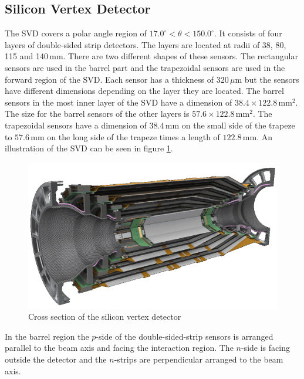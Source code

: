 \documentclass[a4paper,11pt,twosided,final,german,openbib,pdftex,listof=totoc,bibliography=totoc]{scrbook}
\begin{document}
\subsection{Silicon Vertex Detector}
\label{sec:Silicon}
The SVD covers a polar angle region of $17.0^{\circ} < \theta < 150.0^{\circ}$. It consists of four layers of double-sided strip detectors. The layers are located at radii of 38, 80, 115 and 140$\,\textrm{mm}$. There are two different shapes of these sensors. The rectangular sensors are used in the barrel part and the trapezoidal sensors are used in the forward region of the SVD. Each sensor has a thickness of $320\,\mu\textrm{m}$ but the sensors have different dimensions depending on the layer they are located. The barrel sensors in the most inner layer of the SVD have a dimension of $38.4 \times 122.8\,\textrm{mm}^2$. The size for the barrel sensors of the other layers is $57.6 \times 122.8\,\textrm{mm}^2$. The trapezoidal sensors have a dimension of $38.4\,\textrm{mm}$ on the small side of the trapeze to $57.6\,\textrm{mm}$ on the long side of the trapeze times a length of $122.8\,\textrm{mm}$.\cite{B2TR} An illustration of the SVD can be seen in figure \ref{fig:SiliconVertex}. 

\begin{figure}[h!]
	\centering
	\includegraphics[width=\textwidth]{Bilder/SVD.png}
	\caption[Silicon Vertex Detector]{Cross section of the silicon vertex detector\cite{SVDItalian}}
	\label{fig:SiliconVertex}
\end{figure}

In the barrel region the $p$-side of the double-sided-strip sensors is arranged parallel to the beam axis and facing the interaction region. The $n$-side is facing outside the detector and the $n$-strips are perpendicular arranged to the beam axis. 
\end{document}
